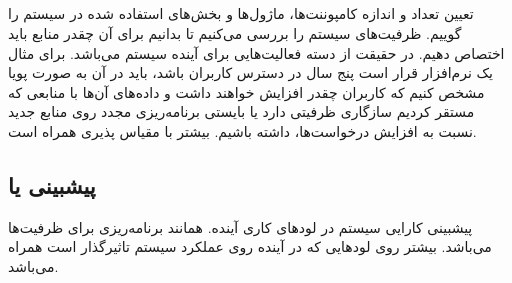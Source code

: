 \documentclass[a4paper]{article}
\begin{document}
\subsection{}

تعیین تعداد و اندازه کامپوننت‌ها، ماژول‌‌ها و بخش‌های استفاده شده در سیستم را
گوییم. ظرفیت‌های سیستم را بررسی می‌کنیم تا بدانیم برای آن چقدر منابع باید اختصاص
دهیم. در حقیقت از دسته فعالیت‌هایی برای آینده سیستم می‌باشد. برای مثال یک
نرم‌افزار قرار است پنج سال در دسترس کاربران باشد، باید در آن به صورت پویا مشخص
کنیم که کاربران چقدر افزایش خواهند داشت و داده‌های آن‌ها با منابعی که مستقر
کردیم سازگاری ظرفیتی دارد یا بایستی برنامه‌ریزی مجدد روی منابع جدید نسبت به
افزایش درخواست‌ها، داشته باشیم. بیشتر با مقیاس پذیری همراه است.

\subsection{پیشبینی یا }

پیشبینی کارایی سیستم در لود‌های کاری آینده. همانند برنامه‌ریزی برای ظرفیت‌ها
می‌باشد. بیشتر روی لود‌هایی که در آینده روی عملکرد سیستم تاثیرگذار است همراه
می‌باشد.
\end{document}
